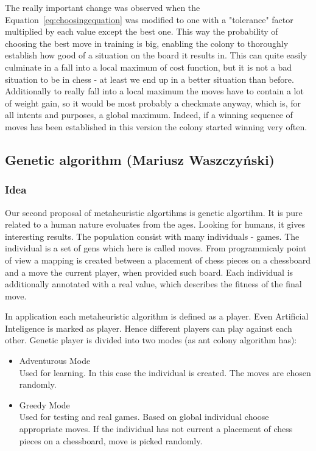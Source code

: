 \documentclass[pdftex]{article}
\begin{document}
The really important change was observed when the Equation~\ref{eq:choosingequation} was modified to one with a "tolerance" factor multiplied by each value except the best one. This way the probability of choosing the best move in training is big, enabling  the colony to thoroughly establish how good of a situation on the board it results in. This can quite easily culminate in a fall into a local maximum of cost function, but it is not a bad situation to be in chess - at least we end up in a better situation than before. Additionally to really fall into a local maximum the moves have to contain a lot of weight gain, so it would be most probably a checkmate anyway, which is, for all intents and purposes, a global maximum. Indeed, if a winning sequence of moves has been established in this version the colony started winning very often.

\subsection{Genetic algorithm (Mariusz Waszczyński)}
\label{sec:genetic}

\subsubsection{Idea}
Our second proposal of metaheuristic algortihms is genetic algortihm. It is pure related to a human nature evoluates from the ages. Looking for humans, it gives interesting results. The population consist with many individuals - games. The individual is a set of gens which here is called moves. From programmicaly point of view a mapping is created between a placement of chess pieces on a chessboard and a move the current player, when provided such board. Each individual is additionally annotated with a real value, which describes the fitness of the final move.

In application each metaheuristic algorithm is defined as a player. Even Artificial Inteligence is marked as player. Hence different players can play against each other. Genetic player is divided into two modes (as ant colony algorithm has):
\begin{itemize}
 	\item Adventurous Mode \hfill \\
		Used for learning. In this case the individual is created. The moves are chosen randomly.

	\item Greedy Mode \hfill \\
		Used for testing and real games. Based on global individual choose appropriate moves. If the individual has not current a placement of chess pieces on a chessboard, move is picked randomly.
\end{itemize}
\end{document}

